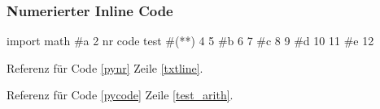 \vspace{4ex}
\subsubsection*{Numerierter Inline Code}
\begin{nrcode}[caption=CCC, label=pynr, linerange={a-c, d-e}]
import math
#\*a
2
nr code test #(*\label{txtline}*)
4
5
#\*b
6
7
#\*c
8
9
#\*d
10
11
#\*e
12
\end{nrcode}

Referenz für Code \ref{pynr} Zeile \ref{txtline}.

Referenz für Code \ref{pycode} Zeile \ref{test_arith}.